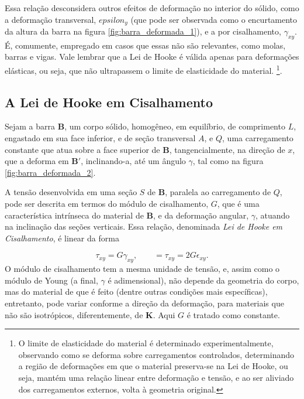 Essa relação desconsidera outros efeitos de deformação no interior do sólido, como a deformação transversal, $epsilon_y$ (que pode ser observada como o encurtamento da altura da barra na figura \ref{fig:barra_deformada_1}), e a por cisalhamento, $\gamma_{xy}$. É, comumente, empregado em casos que essas não são relevantes, como molas, barras e vigas. Vale lembrar que a Lei de Hooke é válida apenas para deformações elásticas, ou seja, que não ultrapassem o limite de elasticidade do material. \footnote{O limite de elasticidade do material é determinado experimentalmente, observando como se deforma sobre carregamentos controlados, determinando a região de deformações em que o material preserva-se na Lei de Hooke, ou seja, mantém uma relação linear entre deformação e tensão, e ao ser aliviado dos carregamentos externos, volta à geometria original.}.

\subsection{A Lei de Hooke em Cisalhamento}

Sejam a barra $\bm{B}$, um corpo sólido, homogêneo, em equilíbrio, de comprimento $L$, engastado em sua face inferior, e de seção transversal $A$, e $Q$, uma carregamento constante que atua sobre a face superior de $\bm{B}$, tangencialmente, na direção de $x$, que a deforma em $\bm{B}'$, inclinando-a, até um ângulo $\gamma$, tal como na figura \ref{fig:barra_deformada_2}. 

A tensão desenvolvida em uma seção $S$ de $\bm{B}$, paralela ao carregamento de  $Q$, pode ser descrita em termos do módulo de cisalhamento, $G$, que é uma característica intrínseca do material de $\bm{B}$, e da deformação angular, $\gamma$, atuando na inclinação das seções verticais. Essa relação, denominada \emph{Lei de Hooke em Cisalhamento}, é linear da forma

\begin{equation}
    \tau_{xy} = G \gamma_{xy}, \qquad = \tau_{xy} = 2G \epsilon_{xy}.
    \label{eq:lei_de_hooke_cisalhamento}
\end{equation}
O módulo de cisalhamento tem a mesma unidade de tensão, e, assim como o módulo de Young (a final, $\gamma$ é adimensional), não depende da geometria do corpo, mas do material de que é feito (dentre outras condições mais específicas), entretanto, pode variar conforme a direção da deformação, para materiais que não são isotrópicos, diferentemente, de $\bm{K}$. Aqui $G$ é tratado como constante.

